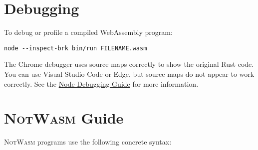 \documentclass{article}
\newcommand{\notwasm}{\textsc{NotWasm}\xspace}
\begin{document}
\section{Debugging}

To debug or profile a compiled WebAssembly program:

\begin{verbatim}
node --inspect-brk bin/run FILENAME.wasm
\end{verbatim}

The Chrome debugger uses source maps correctly to show the original Rust code.
You can use Visual Studio Code or Edge, but source maps do not appear to work
correctly. See the
\href{https://nodejs.org/en/docs/guides/debugging-getting-started/}{Node
Debugging Guide} for more information.

\section{\notwasm Guide}

\notwasm programs use the following concrete syntax:
\end{document}

